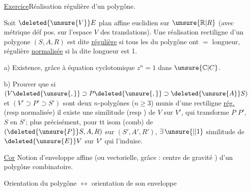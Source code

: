 \uline{Exercice}\qquad Réalisation régulière d'un polygône.

Soit $\deleted{\unsure{V}}E$ plan affine euclidien sur $\unsure{\mathbb{R}|R}$ (avec métrique déf pos. sur l'espace $V$ des translations). Une réalisation rectiligne d'un polygone $(S,A,R)$ est dite \uline{régulière} si tous les  du polygône ont $=$ longueur, régulière  \uline{normalisée} si la dite longueur est 1.

a) Existence, grâce à équation cyclotomique $z^n=1$ dans $\unsure{\mathbb{C}|C}$.

b) Prouver que si $(V\deleted{\unsure{,}}\supset P\deleted{\unsure{,}}\supset\deleted{\unsure{A}}S)$ et $(V'\supset P'\supset S')$ sont deux $n$-polygônes ($n\geq3$) munis d'une  rectiligne \uline{rég.} (resp normalisée) il existe une  similitude (resp )  de $V$ sur $V'$, qui transforme $P$  $P'$, $S$ en $S'$;  plus précisément, pour tt isom (comb) de $(\deleted{\unsure{P}}S,A,R)$ sur $(S',A',R')$, $\exists\,\unsure{\vert|1}$ similitude  de $\deleted{\unsure{E}}V$ sur $V'$ qui l'induise. 

\quad\uline{Cor} Notion d'enveloppe affine (ou vectorielle, grâce : centre de gravité ) d'un polygône combinatoire.

 Orientation du polygône $\longleftrightarrow$ orientation de son enveloppe

